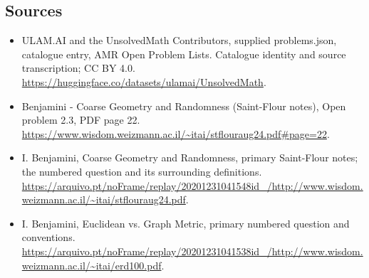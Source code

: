 \documentclass[11pt,a4paper]{article}
\begin{document}
\subsection{Sources}
\begin{itemize}
\item[S1] ULAM.AI and the UnsolvedMath Contributors, supplied problems.json, catalogue entry, AMR Open Problem Lists. Catalogue identity and source transcription; CC BY 4.0.
\url{https://huggingface.co/datasets/ulamai/UnsolvedMath}.
\item[S2] Benjamini - Coarse Geometry and Randomness (Saint-Flour notes), Open problem 2.3, PDF page 22. 
\url{https://www.wisdom.weizmann.ac.il/~itai/stflouraug24.pdf#page=22}.
\item[S3] I. Benjamini, Coarse Geometry and Randomness, primary Saint-Flour notes; the numbered question and its surrounding definitions.
\url{https://arquivo.pt/noFrame/replay/20201231041548id_/http://www.wisdom.weizmann.ac.il/~itai/stflouraug24.pdf}.
\item[S4] I. Benjamini, Euclidean vs. Graph Metric, primary numbered question and conventions.
\url{https://arquivo.pt/noFrame/replay/20201231041538id_/http://www.wisdom.weizmann.ac.il/~itai/erd100.pdf}.
\end{itemize}
\end{document}
